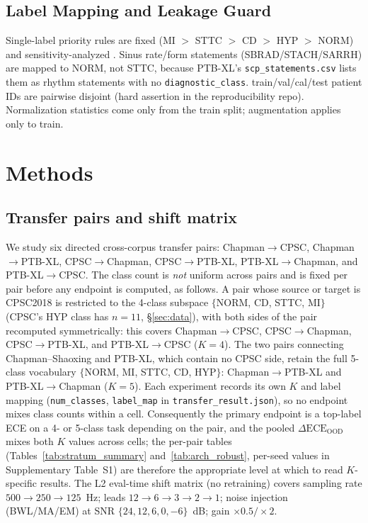 \documentclass[review,12pt,nonatbib]{elsarticle}
\begin{document}
\subsection{Label Mapping and Leakage Guard}
Single-label priority rules are fixed (MI $>$ STTC $>$ CD $>$ HYP $>$ NORM)
and sensitivity-analyzed \cite{wagner2020ptbxl,reyna2022}. Sinus rate/form
statements (SBRAD/STACH/SARRH) are mapped to NORM, not STTC, because
PTB-XL's \texttt{scp\_statements.csv} lists them as rhythm statements
with no \texttt{diagnostic\_class}. train\slash val\slash cal\slash test patient IDs are
pairwise disjoint (hard assertion in the reproducibility repo).
Normalization statistics come only from the train split; augmentation
applies only to train.

\section{Methods}
\label{sec:methods}
\subsection{Transfer pairs and shift matrix}
\label{sec:shiftmatrix}
We study six directed cross-corpus transfer pairs:
Chapman$\rightarrow$CPSC, Chapman$\rightarrow$PTB-XL,
CPSC$\rightarrow$Chapman, CPSC$\rightarrow$PTB-XL,
PTB-XL$\rightarrow$Chapman, and PTB-XL$\rightarrow$CPSC. The class
count is \emph{not} uniform across pairs and is fixed per pair before
any endpoint is computed, as follows. A pair whose source or target is
CPSC2018 is restricted to the 4-class subspace
$\{$NORM, CD, STTC, MI$\}$ (CPSC's HYP class has $n=11$,
\S\ref{sec:data}), with both sides of the pair recomputed symmetrically:
this covers Chapman$\rightarrow$CPSC, CPSC$\rightarrow$Chapman,
CPSC$\rightarrow$PTB-XL, and PTB-XL$\rightarrow$CPSC ($K=4$). The two
pairs connecting Chapman--Shaoxing and PTB-XL, which contain no CPSC
side, retain the full 5-class vocabulary
$\{$NORM, MI, STTC, CD, HYP$\}$: Chapman$\rightarrow$PTB-XL and
PTB-XL$\rightarrow$Chapman ($K=5$). Each experiment records its own
$K$ and label mapping (\texttt{num\_classes}, \texttt{label\_map} in
\texttt{transfer\_result.json}), so no endpoint mixes class counts
within a cell. Consequently the primary endpoint is a top-label ECE on
a 4- or 5-class task depending on the pair, and the pooled
$\Delta\text{ECE}_{\text{OOD}}$ mixes both $K$ values across cells; the
per-pair tables (Tables~\ref{tab:stratum_summary} and~\ref{tab:arch_robust}, per-seed values in Supplementary Table~S1)
are therefore the appropriate level at which to read $K$-specific
results. The L2 eval-time shift matrix (no retraining)
covers sampling rate $500\rightarrow250\rightarrow125$~Hz; leads
$12\rightarrow6\rightarrow3\rightarrow2\rightarrow1$; noise injection
(BWL/MA/EM) at SNR $\{24,12,6,0,-6\}$~dB; gain $\times0.5/\times2$.
\end{document}
